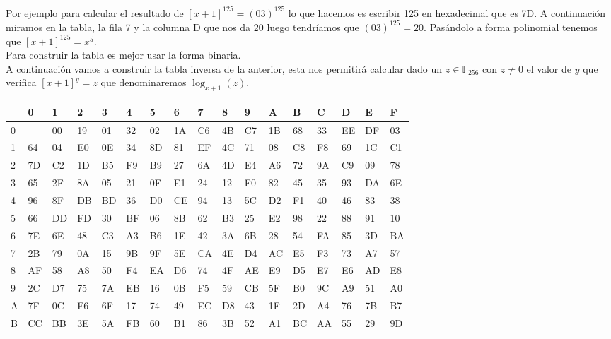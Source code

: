 Por ejemplo para calcular el resultado de $[x+1]^{125}=(03)^{125}$ lo que hacemos es escribir 125 en hexadecimal que es 7D. A continuación miramos en la tabla, la fila 7 y la columna D que nos da 20 luego tendríamos que $(03)^{125}=20$. Pasándolo a forma polinomial tenemos que $[x+1]^{125}=x^5$.\\
Para construir la tabla es mejor usar la forma binaria.\\

A continuación vamos a construir la tabla inversa de la anterior, esta nos permitirá calcular dado un $z \in \mathbb{F}_{256}$ con $z \neq 0$ el valor de $y$ que verifica $[x+1]^y=z$ que denominaremos $\log_{x+1}(z)$.
\begin{table}[!htb]
    \begin{adjustwidth}{-.8in}{-.8in}  
\begin{tabular}{|l|l|l|l|l|l|l|l|l|l|l|l|l|l|l|l|l|}
\hline
  & 0  & 1  & 2  & 3  & 4  & 5  & 6  & 7  & 8  & 9  & A  & B  & C  & D  & E  & F  \\ \hline
0 &    & 00 & 19 & 01 & 32 & 02 & 1A & C6 & 4B & C7 & 1B & 68 & 33 & EE & DF & 03 \\ \hline
1 & 64 & 04 & E0 & 0E & 34 & 8D & 81 & EF & 4C & 71 & 08 & C8 & F8 & 69 & 1C & C1 \\ \hline
2 & 7D & C2 & 1D & B5 & F9 & B9 & 27 & 6A & 4D & E4 & A6 & 72 & 9A & C9 & 09 & 78 \\ \hline
3 & 65 & 2F & 8A & 05 & 21 & 0F & E1 & 24 & 12 & F0 & 82 & 45 & 35 & 93 & DA & 6E \\ \hline
4 & 96 & 8F & DB & BD & 36 & D0 & CE & 94 & 13 & 5C & D2 & F1 & 40 & 46 & 83 & 38 \\ \hline
5 & 66 & DD & FD & 30 & BF & 06 & 8B & 62 & B3 & 25 & E2 & 98 & 22 & 88 & 91 & 10 \\ \hline
6 & 7E & 6E & 48 & C3 & A3 & B6 & 1E & 42 & 3A & 6B & 28 & 54 & FA & 85 & 3D & BA \\ \hline
7 & 2B & 79 & 0A & 15 & 9B & 9F & 5E & CA & 4E & D4 & AC & E5 & F3 & 73 & A7 & 57 \\ \hline
8 & AF & 58 & A8 & 50 & F4 & EA & D6 & 74 & 4F & AE & E9 & D5 & E7 & E6 & AD & E8 \\ \hline
9 & 2C & D7 & 75 & 7A & EB & 16 & 0B & F5 & 59 & CB & 5F & B0 & 9C & A9 & 51 & A0 \\ \hline
A & 7F & 0C & F6 & 6F & 17 & 74 & 49 & EC & D8 & 43 & 1F & 2D & A4 & 76 & 7B & B7 \\ \hline
B & CC & BB & 3E & 5A & FB & 60 & B1 & 86 & 3B & 52 & A1 & BC & AA & 55 & 29 & 9D \\ \hline

\end{tabular}
\end{adjustwidth}
\end{table}
